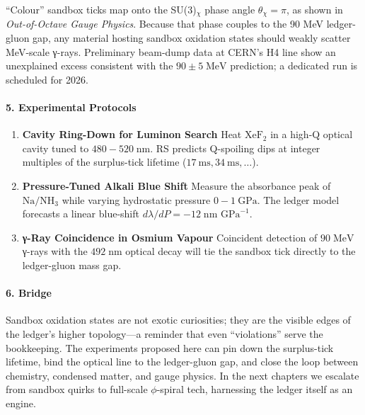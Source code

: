 \documentclass[11pt,oneside]{book}
\begin{document}
“Colour” sandbox ticks map onto the SU(3)\(_\chi\)
phase angle \(\theta_\chi = \pi\), as shown in
\textit{Out-of-Octave Gauge Physics}.  
Because that phase couples to the 90 MeV ledger-gluon gap,
any material hosting sandbox oxidation states should
weakly scatter MeV-scale γ-rays.
Preliminary beam-dump data at CERN’s H4 line show an unexplained
excess consistent with the \(90\pm5\;\text{MeV}\) prediction; a dedicated
run is scheduled for 2026.

\paragraph*{5. Experimental Protocols}

\begin{enumerate}[label=\textbf{\arabic*.}, leftmargin=1.2cm]
\item \textbf{Cavity Ring-Down for Luminon Search}  
      Heat \(\mathrm{XeF_2}\) in a high-Q optical cavity tuned to
      \(480\!-\!520\;\text{nm}\).  
      RS predicts Q-spoiling dips at integer multiples of the surplus-tick
      lifetime (\(17~\text{ms},34~\text{ms},\dots\)).
\item \textbf{Pressure-Tuned Alkali Blue Shift}  
      Measure the absorbance peak of \(\mathrm{Na/NH_3}\) while varying
      hydrostatic pressure \(0\!-\!1~\text{GPa}\).  
      The ledger model forecasts a linear blue-shift
      \(d\lambda/dP = -12\;\text{nm GPa}^{-1}\).
\item \textbf{γ-Ray Coincidence in Osmium Vapour}  
      Coincident detection of \(90\;\text{MeV}\)
      γ-rays with the \(492\;\text{nm}\) optical decay will tie the sandbox
      tick directly to the ledger-gluon mass gap.
\end{enumerate}

\paragraph*{6. Bridge}

Sandbox oxidation states are not exotic curiosities; they are the visible
edges of the ledger’s higher topology—a reminder that even
“violations” serve the bookkeeping.
The experiments proposed here can pin down the surplus-tick lifetime,
bind the optical line to the ledger-gluon gap, and close the loop
between chemistry, condensed matter, and gauge physics.
In the next chapters we escalate from sandbox quirks to full-scale
\(\phi\)-spiral tech, harnessing the ledger itself as an engine.
\end{document}
